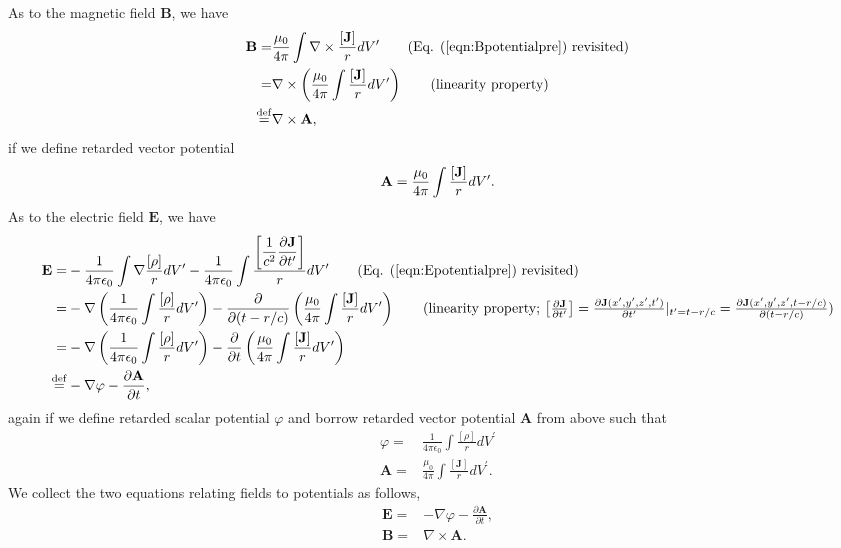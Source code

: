 \documentclass[11pt]{article}              %
\begin{document}
As to the magnetic field ${\mathbf B}$, we have
\begin{align}
    {\mathbf B}=&\frac{\mu_0}{4\pi}\int\nabla\times\frac{[{\mathbf J}]}{r}dV^\prime\tag{Eq. (\ref{eqn:Bpotentialpre}) revisited}\\
    =&\nabla\times\left(\frac{\mu_0}{4\pi}\int\frac{[{\mathbf J}]}{r}dV^\prime\right)\tag{linearity property}\\
    \stackrel{\operatorname{def}}{=}&\nabla\times{\mathbf A},\notag
\end{align}
if we define retarded vector potential
\begin{align}
    {\mathbf A}=\frac{\mu_0}{4\pi}\int{\frac{[{\mathbf J}]}{r}}dV^\prime.\notag
\end{align}
As to the electric field ${\mathbf E}$, we have
\begin{align}
{\mathbf E}=&-\frac{1}{4\pi\epsilon_0}\int\nabla\frac{\left[\rho\right]}{r}dV^\prime
    -\frac{1}{4\pi\epsilon_0}\int\frac{\left[\dfrac{1}{c^2}\dfrac{\partial {\mathbf J}}{\partial t^\prime}\right]}{r}dV^\prime\tag{Eq. (\ref{eqn:Epotentialpre}) revisited}\\
    =&-\nabla\left(\frac{1}{4\pi\epsilon_0}\int\frac{\left[\rho\right]}{r}dV^\prime\right)
    -\frac{\partial}{\partial (t-r/c)}\left(\frac{\mu_0}{4\pi}\int\frac{[{\mathbf J}]}{r}dV^\prime\right)\tag{linearity property; $\left[\frac{\partial \mathbf {J}}{\partial t^\prime}\right]=\frac{\partial \mathbf{J}(x^\prime,y^\prime,z^\prime,t^\prime)}{\partial t^\prime}|_{t^\prime=t-r/c}=\frac{\partial \mathbf{J}(x^\prime,y^\prime,z^\prime,t-r/c)}{\partial (t-r/c)}$}\\
    =&-\nabla\left(\frac{1}{4\pi\epsilon_0}\int\frac{\left[\rho\right]}{r}dV^\prime\right)
    -\frac{\partial}{\partial t}\left(\frac{\mu_0}{4\pi}\int\frac{[{\mathbf J}]}{r}dV^\prime\right)\notag\\
    \stackrel{\operatorname{def}}{=}&-\nabla\varphi-\frac{\partial {\mathbf A}}{\partial t},\notag
\end{align}
again if we define retarded scalar potential $\varphi$ and borrow retarded vector potential ${\mathbf A}$ from above such that
\begin{align}
    \varphi=&\frac{1}{4\pi\epsilon_0}\int\frac{\left[\rho\right]}{r}dV^\prime\label{eqn:Epotential}\\
    {\mathbf A}=&\frac{\mu_0}{4\pi}\int\frac{[{\mathbf J}]}{r}dV^\prime\label{eqn:Bpotential}.
\end{align}
We collect the two equations relating fields to potentials as follows,
\begin{align}
    {\mathbf E}=&-\nabla\varphi-\frac{\partial {\mathbf A}}{\partial t},\\
    {\mathbf B}=&\nabla\times{\mathbf A}.
\end{align}
\end{document}
